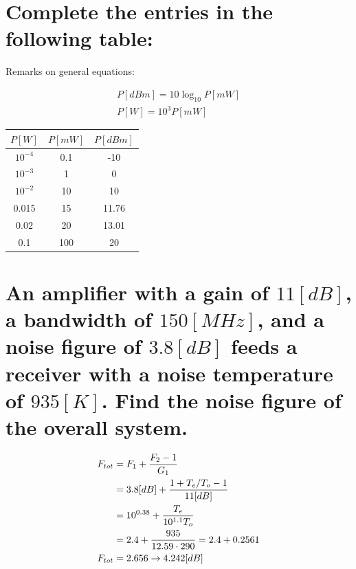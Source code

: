 \documentclass[12pt, letterpaper]{article}
\begin{document}
\pagebreak

\section{Complete the entries in the following table:}


\vspace{2em}
Remarks on general equations:

\begin{align}
  P[dBm]=10\log_{10}P[mW]\\
  P[W]=10^3P[mW]
\end{align}
\vspace{2em}

\begin{center}
  \begin{tabular}{| c | c | c |}
    \hline
    $P[W]$ & $P[mW]$ & $P[dBm]$ \\
    \hline
    $10^{-4}$ & {\color{blue}0.1} & {\color{blue}-10} \\
    \hline
    {\color{blue}$10^{-3}$} & 1 & {\color{blue}0} \\
    \hline
    {\color{blue}$10^{-2}$} & {\color{blue}10} & 10 \\
    \hline
    {\color{blue}0.015} & 15 & {\color{blue}11.76} \\
    \hline
    0.02 & {\color{blue}20} & {\color{blue}13.01} \\
    \hline
    {\color{blue}0.1} & {\color{blue}100} & 20 \\
    \hline
  \end{tabular}
\end{center}

\section{An amplifier with a gain of $11 [dB]$, a bandwidth of $150 [MHz]$, and a noise figure of $3.8 [dB]$ feeds a receiver with a noise temperature of $935 [K]$. Find the noise figure of the overall system.}

\begin{align}
  F_{tot}
  &=
  F_1
  +
  {F_2-1\over G_1}
  \\
  &=
  3.8[dB]
  +
  {1+T_e/T_o-1\over 11[dB]}
  \\
  &=
  10^{0.38}
  +
  {T_e\over10^{1.1}T_o}
  \\
  &=
  2.4
  +
  {935\over12.59\cdot290}
  =
  2.4+0.2561
  \\
  F_{tot}
  &=
  2.656
  \rightarrow
  4.242[dB]
\end{align}
\end{document}
